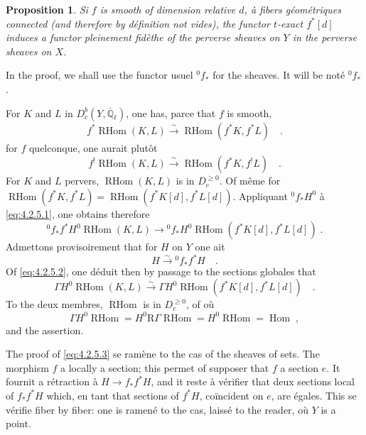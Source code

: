 \documentclass[12pt,a4paper]{article}
\theoremstyle{plain}
\newtheorem{proposition}[theorem]{Proposition}
\theoremstyle{definition}
\DeclareMathOperator{\Hom}{Hom}
\DeclareMathOperator{\RHom}{RHom}
\newcommand{\isom}{\xrightarrow{\sim}}
\providecommand{\Hom}{\operatorname{Hom}}
\providecommand{\R}{\mathrm{R}}
\providecommand{\RHom}{\operatorname{RHom}}
\begin{document}
\begin{proposition}\label{prop:4.2.5}
Si $f$ is smooth of dimension relative $d$, \`{a} fibers g\'{e}om\'{e}triques connected (and therefore by d\'{e}finition not vides), the functor $t$-exact $f^{*}[d]$ induces a functor pleinement fid\`{e}the of the perverse sheaves on $Y$ in the perverse sheaves on $X$.
\end{proposition}

In the proof, we shall use the functor usuel ${}^{0}f_{*}$ for the sheaves. It will be not\'{e} ${}^{0}f_{*}$.

For $K$ and $L$ in $D_{c}^{b}(Y,\overline{\mathbb{Q}}_{\ell})$, one has, parce that $f$ is smooth,
\begin{equation}\label{eq:4.2.5.1}
f^{*}\RHom(K,L) \isom \RHom(f^{*}K, f^{*}L)\quad.
\end{equation}
for $f$ quelconque, one aurait plut\^{o}t
\[
f^{!}\RHom(K,L) \isom \RHom(f^{*}K, f^{!}L)\quad.
\]
For $K$ and $L$ pervers, $\RHom(K,L)$ is in $D_{c}^{\geq 0}$. Of m\^{e}me for $\RHom(f^{*}K, f^{*}L) = \RHom(f^{*}K[d], f^{*}L[d])$. Appliquant ${}^{0}f_{*}H^{0}$ \`{a} \eqref{eq:4.2.5.1}, one obtains therefore
\begin{equation}\label{eq:4.2.5.2}
{}^{0}f_{*}f^{*}H^{0}\RHom(K,L) \longrightarrow {}^{0}f_{*}H^{0}\RHom(f^{*}K[d], f^{*}L[d])\;.
\end{equation}
Admettons provisoirement that for $H$ on $Y$ one ait
\begin{equation}\label{eq:4.2.5.3}
H \isom {}^{0}f_{*}f^{*}H\quad.
\end{equation}
Of \eqref{eq:4.2.5.2}, one d\'{e}duit then by passage to the sections globales that
\[
\Gamma H^{0}\RHom(K,L) \isom \Gamma H^{0}\RHom(f^{*}K[d], f^{*}L[d])\quad.
\]
To the deux membres, $\RHom$ is in $D_{c}^{\geq 0}$, of o\`{u}
\[
\Gamma H^{0}\RHom = H^{0}\R\Gamma\RHom = H^{0}\RHom = \Hom\;,
\]
and the assertion.

The proof of \eqref{eq:4.2.5.3} se ram\`{e}ne to the cas of the sheaves of sets. The morphism $f$ a locally a section; this permet of supposer that $f$ a section $e$. It fournit a r\'{e}traction \`{a} $H \longrightarrow f_{*}f^{*}H$, and it reste \`{a} v\'{e}rifier that deux sections local of $f_{*}f^{*}H$ which, en tant that sections of $f^{*}H$, co\"{i}ncident on $e$, are \'{e}gales. This se v\'{e}rifie fiber by fiber: one is ramen\'{e} to the cas, laiss\'{e} to the reader, o\`{u} $Y$ is a point.
\end{document}
